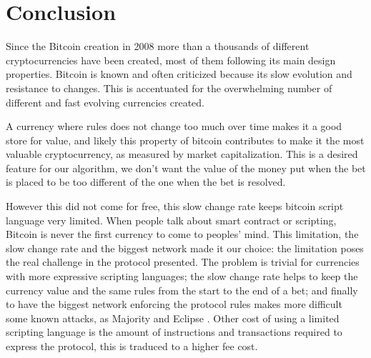 \section{Conclusion}

Since the Bitcoin creation in 2008 more than a thousands of different
  cryptocurrencies have been created, most of them following its main design
  properties.
Bitcoin is known and often criticized because its slow evolution and resistance
  to changes.
This is accentuated for the overwhelming number of different and fast evolving
  currencies created.

A currency where rules does not change too much over time makes it a good store
  for value, and likely this property of bitcoin contributes to make it the
  most valuable cryptocurrency, as measured by market capitalization.
This is a desired feature for our algorithm, we don't want the value of the
  money put when the bet is placed to be too different of the one when the bet
  is resolved.

However this did not come for free, this slow change rate keeps bitcoin script
  language very limited.
When people talk about smart contract or scripting, Bitcoin is never the first
  currency to come to peoples' mind.
This limitation, the slow change rate and the biggest network made it our
  choice: the limitation poses the real challenge in the protocol presented.
The problem is trivial for currencies with more expressive scripting languages;
  the slow change rate helps to keep the currency value and the same rules from
  the start to the end of a bet; and finally to have the biggest network
  enforcing the protocol rules makes more difficult some known attacks, as
  Majority and Eclipse \cite{heilman2015attack}.
Other cost of using a limited scripting language is the amount of instructions
  and transactions required to express the protocol, this is traduced to a
  higher fee cost.



